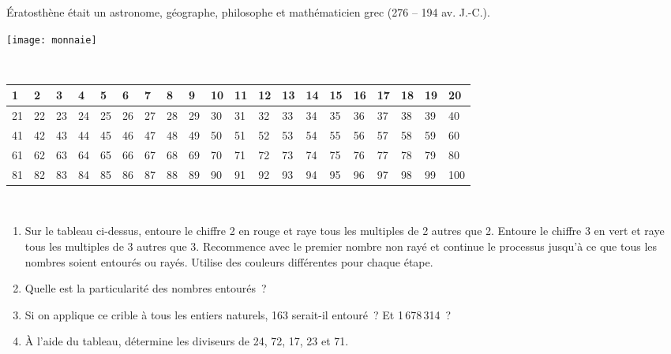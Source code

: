 \newpage

\begin{activite}

 \begin{minipage}[c]{0.6\textwidth}
Ératosthène était un astronome, géographe, philosophe et mathématicien grec (276 – 194 av. J.-C.).
 \end{minipage} \hfill%
 \begin{minipage}[c]{0.2\textwidth}
  \texttt{[image: monnaie]}
  \end{minipage} \\[1em]
  
\begin{tabularx}{1.01\linewidth}{|X|X|X|X|X|X|X|X|X|X|X|X|X|X|X|X|X|X|X|X|}
     \hline
     1 & 2 & 3 & 4 & 5 & 6 & 7 & 8 & 9 & 10 & 11 & 12 & 13 & 14 & 15 & 16 & 17 & 18 & 19 & 20 \\ \hline
     21 & 22 & 23 & 24 & 25 & 26 & 27 & 28 & 29 & 30 & 31 & 32 & 33 & 34 & 35 & 36 & 37 & 38 & 39 & 40 \\ \hline
     41 & 42 & 43 & 44 & 45 & 46 & 47 & 48 & 49 & 50 & 51 & 52 & 53 & 54 & 55 & 56 & 57 & 58 & 59 & 60 \\ \hline
     61 & 62 & 63 & 64 & 65 & 66 & 67 & 68 & 69 & 70 & 71 & 72 & 73 & 74 & 75 & 76 & 77 & 78 & 79 & 80 \\ \hline
     81 & 82 & 83 & 84 & 85 & 86 & 87 & 88 & 89 & 90 & 91 & 92 & 93 & 94 & 95 & 96 & 97 & 98 & 99 & \small{100} \\ \hline
  \end{tabularx} \\
  
\begin{enumerate}             
 \item Sur le tableau ci-dessus, entoure le chiffre 2 en rouge et raye tous les multiples de 2 autres que 2. Entoure le chiffre 3 en vert et raye tous les multiples de 3 autres que 3. Recommence avec le premier nombre non rayé et continue le processus jusqu'à ce que tous les nombres soient entourés ou rayés. Utilise des couleurs différentes pour chaque étape.
 \item Quelle est la particularité des nombres entourés ?
 \item Si on applique ce crible à tous les entiers naturels, 163 serait-il entouré ? Et 1\,678\,314 ?
 \item À l'aide du tableau, détermine les diviseurs de 24, 72, 17, 23 et 71.
 \end{enumerate}

\end{activite}

